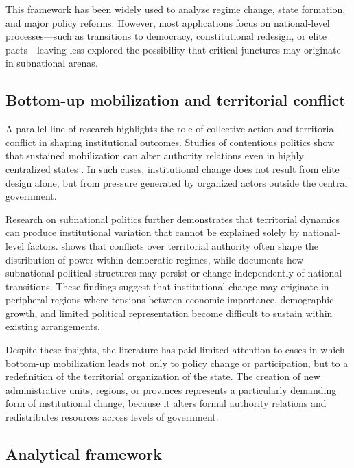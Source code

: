 \documentclass[12pt]{article}
\begin{document}
This framework has been widely used to analyze regime change, state
formation, and major policy reforms. However, most applications focus on
national-level processes---such as transitions to democracy,
constitutional redesign, or elite pacts---leaving less explored the
possibility that critical junctures may originate in subnational arenas.

\subsection*{Bottom-up mobilization and territorial conflict}

A parallel line of research highlights the role of collective action and
territorial conflict in shaping institutional outcomes. Studies of
contentious politics show that sustained mobilization can alter authority
relations even in highly centralized states
\autocite{tilly_social_2004,abers_inventing_2000}. In such cases, institutional change
does not result from elite design alone, but from pressure generated by
organized actors outside the central government.

Research on subnational politics further demonstrates that territorial
dynamics can produce institutional variation that cannot be explained
solely by national-level factors. \textcite{gibson_boundary_2005} shows that
conflicts over territorial authority often shape the distribution of
power within democratic regimes, while \textcite{giraudy_politics_2010} documents
how subnational political structures may persist or change independently
of national transitions. These findings suggest that institutional change
may originate in peripheral regions where tensions between economic
importance, demographic growth, and limited political representation
become difficult to sustain within existing arrangements.

Despite these insights, the literature has paid limited attention to
cases in which bottom-up mobilization leads not only to policy change or
participation, but to a redefinition of the territorial organization of
the state. The creation of new administrative units, regions, or
provinces represents a particularly demanding form of institutional
change, because it alters formal authority relations and redistributes
resources across levels of government.

\subsection*{Analytical framework}
\end{document}
